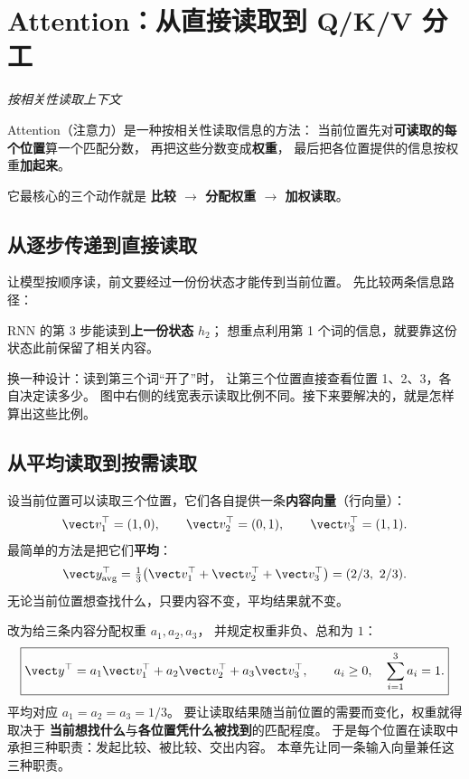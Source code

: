 \chapterrule
\section{Attention：从直接读取到 Q/K/V 分工}
\label{intro:21c-naive-attention}
\label{intro:21b-why-attention}
\label{concept:attention}

\begin{idea}
\noindent\emph{按相关性读取上下文}\par

Attention（注意力）是一种按相关性读取信息的方法：
当前位置先对\textbf{可读取的每个位置}算一个匹配分数，
再把这些分数变成\textbf{权重}，
最后把各位置提供的信息按权重\textbf{加起来}。

它最核心的三个动作就是
\textbf{比较 $\to$ 分配权重 $\to$ 加权读取}。
\end{idea}

\subsection{从逐步传递到直接读取}

 让模型按顺序读，前文要经过一份份状态才能传到当前位置。
先比较两条信息路径：

RNN 的第 3 步能读到\textbf{上一份状态} $h_2$；
想重点利用第 1 个词的信息，就要靠这份状态此前保留了相关内容。

换一种设计：读到第三个词“开了”时，
让第三个位置直接查看位置 1、2、3，各自决定读多少。
图中右侧的线宽表示读取比例不同。接下来要解决的，就是怎样算出这些比例。

\subsection{从平均读取到按需读取}

设当前位置可以读取三个位置，它们各自提供一条\textbf{内容向量}（行向量）：
\[
\vect v_1^\top=(1,0),\qquad
\vect v_2^\top=(0,1),\qquad
\vect v_3^\top=(1,1).
\]
最简单的方法是把它们\textbf{平均}：
\[
\vect y_{\rm avg}^\top
=\tfrac13\bigl(\vect v_1^\top+\vect v_2^\top+\vect v_3^\top\bigr)
=(2/3,\ 2/3).
\]
无论当前位置想查找什么，只要内容不变，平均结果就不变。

改为给三条内容分配权重 $a_1,a_2,a_3$，
并规定权重非负、总和为 $1$：
\begin{equation}
\boxed{\vect y^\top=a_1\vect v_1^\top+a_2\vect v_2^\top+a_3\vect v_3^\top,\qquad
a_i\ge0,\quad \sum_{i=1}^3 a_i=1.}
\label{eq:attention-design-goal}
\end{equation}
平均对应 $a_1=a_2=a_3=1/3$。
要让读取结果随当前位置的需要而变化，权重就得取决于
\textbf{当前想找什么}与\textbf{各位置凭什么被找到}的匹配程度。
于是每个位置在读取中承担三种职责：发起比较、被比较、交出内容。
本章先让同一条输入向量兼任这三种职责。

